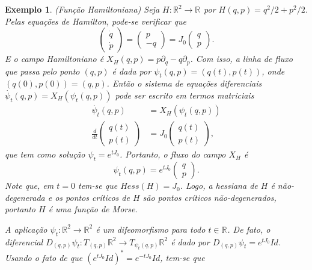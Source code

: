 \documentclass[12pt]{book}
\newtheorem{exemplo}[teorema]{Exemplo}
\newcommand{\campohamiltoniano}[1]{X_{H}(#1)}
\newcommand{\campohamiltonianoabrev}{X_{H}}
\newcommand{\derivada}[2]{\frac{d #1}{d #2}}
\newcommand{\estruturacomplexa}{J_{0}}
\newcommand{\real}[1]{\mathbb{R}^{#1}}
\newcommand{\reta}{\real{}}
\begin{document}
	\begin{exemplo}\label{exemplo_funcao_hamiltoniana}
		(Função Hamiltoniana) Seja $H:\real{2} \to \reta$ por $H(q,p) = q^{2}/2+p^{2}/2$. Pelas equações de Hamilton, pode-se verificar que 
		$$
			\left(
			\begin{array}{c}
			\dot{q}
			\\
			\dot{p}
			\end{array}
			\right) = 
			\left(
			\begin{array}{c}
			p
			\\
			-q
			\end{array}
			\right)
			=\estruturacomplexa
			\left(
			\begin{array}{c}
			q
			\\
			p
			\end{array}
			\right).
		$$
		E o campo Hamiltoniano é $\campohamiltoniano{q,p} = p\partial_{q}-q\partial_{p}$. Com isso, a linha de fluxo que passa pelo ponto $(q,p)$ é dada por $\psi_{t}(q,p) = (q(t), p(t))$, onde $(q(0), p(0)) = (q, p)$. Então o sistema de equações diferenciais $\dot{\psi_{t}}(q,p) = \campohamiltoniano{\psi_{t}(q,p)}$ pode ser escrito em termos matriciais
		$$
		\begin{aligned}
		\dot{\psi_{t}}(q,p) &=  \campohamiltoniano{\psi_{t}(q,p)}
		\\
		\derivada{}{t}\left(
		\begin{array}{c}
		q(t)
		\\
		p(t)
		\end{array}
		\right)
		&=
		\estruturacomplexa
		\left(
		\begin{array}{c}
		q(t)
		\\
		p(t)
		\end{array}
		\right),
		\end{aligned}
		$$ 
		que tem como solução $\psi_{t}=e^{t\estruturacomplexa}$. Portanto, o fluxo do campo $\campohamiltonianoabrev$ é
		$$
		\psi_{t}(q,p) = e^{t\estruturacomplexa}
		\left(
		\begin{array}{c}
		q
		\\
		p
		\end{array}
		\right).
		$$
		Note que, em $t=0$ tem-se que $Hess(H) = \estruturacomplexa$. Logo, a hessiana de $H$ é não-degenerada e os pontos críticos de $H$ são pontos críticos não-degenerados, portanto $H$ é uma função de Morse.
		
		A aplicação $\psi_{t}:\real{2}\to \real{2}$ é um difeomorfismo para todo $t\in \reta$. De fato, o diferencial $	D_{(q,p)}\psi_{t}:T_{(q,p)}\real{2}\to T_{\psi_{t}(q,p)}\real{2}$ é dado por $	D_{(q,p)}\psi_{t} = e^{t\estruturacomplexa}Id$. Usando o fato de que $(e^{t\estruturacomplexa}Id)^{*} = e^{-t\estruturacomplexa}Id$, tem-se que
		

\end{exemplo}
\end{document}
